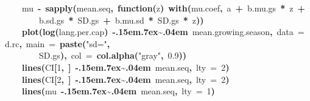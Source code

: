 \documentclass{article}
\makeatletter
\newcommand{\hlnumber}[1]{\textcolor[rgb]{0,0,0}{#1}}%
\newcommand{\hlfunctioncall}[1]{\textcolor[rgb]{.5,0,.33}{\textbf{#1}}}%
\newcommand{\hlstring}[1]{\textcolor[rgb]{.6,.6,1}{#1}}%
\newcommand{\hlkeyword}[1]{\textbf{#1}}%
\newcommand{\hlargument}[1]{\textcolor[rgb]{.69,.25,.02}{#1}}%
\newcommand{\hlformalargs}[1]{\hlargument{#1}}%
\newcommand{\hlassignement}[1]{\textbf{#1}}%
\newcommand{\hlsymbol}[1]{#1}%
\def\urltilda{\kern -.15em\lower .7ex\hbox{\~{}}\kern .04em}%
\newcommand{\hlstd}[1]{\textcolor[rgb]{0,0,0}{#1}}%
\newenvironment{kframe}{%
 \def\FrameCommand##1{\hskip\@totalleftmargin \hskip-\fboxsep
 \colorbox{shadecolor}{##1}\hskip-\fboxsep
     \hskip-\linewidth \hskip-\@totalleftmargin \hskip\columnwidth}%
 \MakeFramed {\advance\hsize-\width
   \@totalleftmargin\z@ \linewidth\hsize
   \@setminipage}}%
 {\par\unskip\endMakeFramed}
\newenvironment{knitrout}{}{} %
\makeatother
\begin{document}
\begin{knitrout}
{\begin{kframe}
\begin{flushleft}
\hlstd{}{\ }{\ }{\ }{\ }\hlsymbol{mu}{\ }\hlassignement{\usebox{\hlnormalsizeboxlessthan}-}{\ }\hlfunctioncall{sapply}\hlkeyword{(}\hlsymbol{mean.seq}\hlkeyword{,}{\ }\hlkeyword{function}\hlkeyword{(}\hlformalargs{z}\hlkeyword{)}{\ }\hlfunctioncall{with}\hlkeyword{(}\hlsymbol{mu.coef}\hlkeyword{,}{\ }\hlsymbol{a}{\ }\hlkeyword{+}{\ }\hlsymbol{b.mu.gs}{\ }\hlkeyword{*}{\ }\hlsymbol{z}{\ }\hlkeyword{+}\hspace*{\fill}\\
\hlstd{}{\ }{\ }{\ }{\ }{\ }{\ }{\ }{\ }\hlsymbol{b.sd.gs}{\ }\hlkeyword{*}{\ }\hlsymbol{SD.gs}{\ }\hlkeyword{+}{\ }\hlsymbol{b.mu.sd}{\ }\hlkeyword{*}{\ }\hlsymbol{SD.gs}{\ }\hlkeyword{*}{\ }\hlsymbol{z}\hlkeyword{)}\hlkeyword{)}\hspace*{\fill}\\
\hlstd{}{\ }{\ }{\ }{\ }\hlfunctioncall{plot}\hlkeyword{(}\hlfunctioncall{log}\hlkeyword{(}\hlsymbol{lang.per.cap}\hlkeyword{)}{\ }\hlkeyword{\urltilda{}}{\ }\hlsymbol{mean.growing.season}\hlkeyword{,}{\ }\hlargument{data}{\ }\hlargument{=}{\ }\hlsymbol{d.rc}\hlkeyword{,}{\ }\hlargument{main}{\ }\hlargument{=}{\ }\hlfunctioncall{paste}\hlkeyword{(}\hlstring{"sd="}\hlkeyword{,}\hspace*{\fill}\\
\hlstd{}{\ }{\ }{\ }{\ }{\ }{\ }{\ }{\ }\hlsymbol{SD.gs}\hlkeyword{)}\hlkeyword{,}{\ }\hlargument{col}{\ }\hlargument{=}{\ }\hlfunctioncall{col.alpha}\hlkeyword{(}\hlstring{"gray"}\hlkeyword{,}{\ }\hlnumber{0.9}\hlkeyword{)}\hlkeyword{)}\hspace*{\fill}\\
\hlstd{}{\ }{\ }{\ }{\ }\hlfunctioncall{lines}\hlkeyword{(}\hlsymbol{CI}\hlkeyword{[}\hlnumber{1}\hlkeyword{,}{\ }\hlkeyword{]}{\ }\hlkeyword{\urltilda{}}{\ }\hlsymbol{mean.seq}\hlkeyword{,}{\ }\hlargument{lty}{\ }\hlargument{=}{\ }\hlnumber{2}\hlkeyword{)}\hspace*{\fill}\\
\hlstd{}{\ }{\ }{\ }{\ }\hlfunctioncall{lines}\hlkeyword{(}\hlsymbol{CI}\hlkeyword{[}\hlnumber{2}\hlkeyword{,}{\ }\hlkeyword{]}{\ }\hlkeyword{\urltilda{}}{\ }\hlsymbol{mean.seq}\hlkeyword{,}{\ }\hlargument{lty}{\ }\hlargument{=}{\ }\hlnumber{2}\hlkeyword{)}\hspace*{\fill}\\
\hlstd{}{\ }{\ }{\ }{\ }\hlfunctioncall{lines}\hlkeyword{(}\hlsymbol{mu}{\ }\hlkeyword{\urltilda{}}{\ }\hlsymbol{mean.seq}\hlkeyword{,}{\ }\hlargument{lty}{\ }\hlargument{=}{\ }\hlnumber{1}\hlkeyword{)}\hspace*{\fill}\\

\end{flushleft}
\end{kframe}}
\end{knitrout}
\end{document}
